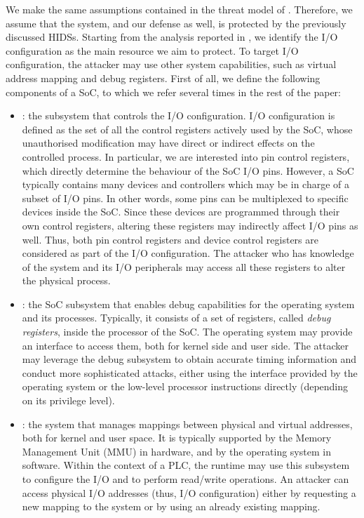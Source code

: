 We make the same assumptions contained in the threat model of .
Therefore, we assume that the system, and our defense as well, is protected by the previously discussed HIDSs.
Starting from the analysis reported in , we identify the I/O configuration as the main resource we aim to protect.
To target I/O configuration, the attacker may use other system capabilities, such as virtual address mapping and debug registers.
First of all, we define the following components of a SoC, to which we refer several times in the rest of the paper:
\begin{itemize}
	\item {}: the subsystem that controls the I/O configuration. I/O configuration is defined as the set of all the control registers
		actively used by the SoC, whose unauthorised modification may have direct or indirect effects on the controlled process.
		In particular, we are interested into pin control registers, which directly determine the behaviour of the SoC I/O pins.
		However, a SoC typically contains many devices and controllers which may be in charge of a subset of I/O pins. In other words, some pins
		can be multiplexed to specific devices inside the SoC. Since these devices are programmed through their own control registers,
		altering these registers may indirectly affect I/O pins as well. Thus, both pin control registers and device control registers
		are considered as part of the I/O configuration. The attacker who has knowledge of the system and its I/O peripherals may access
		all these registers to alter the physical process.
	\item {}: the SoC subsystem that enables debug capabilities for the operating system and its processes.
		Typically, it consists of a set of registers, called \emph{debug registers}, inside the processor of the SoC.
		The operating system may provide an interface to access them, both for kernel side and user side.
		The attacker may leverage the debug subsystem to obtain accurate timing information and conduct more sophisticated attacks,
		either using the interface provided by the operating system or the low-level processor instructions directly (depending on its privilege level).
	\item {}: the system that manages mappings between physical and virtual addresses, both for kernel and user space.
		It is typically supported by the Memory Management Unit (MMU) in hardware, and by the operating system in software. Within the context of a PLC,
		the runtime may use this subsystem to configure the I/O and to perform read/write operations. An attacker can access physical I/O addresses
		(thus, I/O configuration) either by requesting a new mapping to the system or by using an already existing mapping.
\end{itemize}

